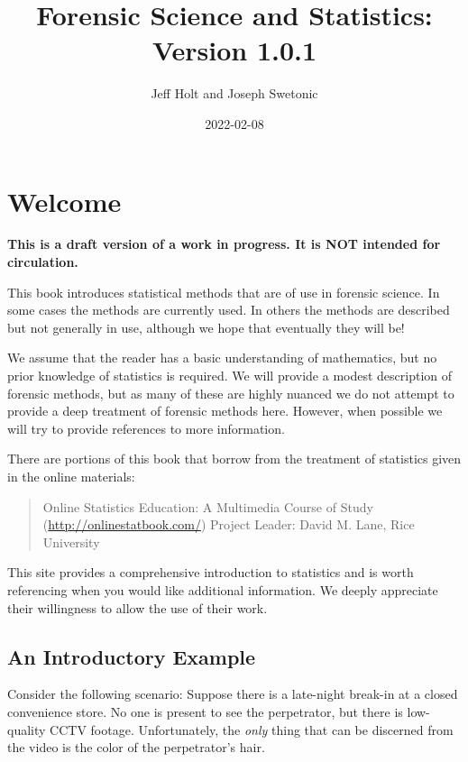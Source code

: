 \documentclass[
]{book}
\title{Forensic Science and Statistics: Version 1.0.1}
\author{Jeff Holt and Joseph Swetonic}
\date{2022-02-08}
\begin{document}
\maketitle

{
\setcounter{tocdepth}{1}
\tableofcontents
}
\hypertarget{welcome}{%
\chapter{Welcome}\label{welcome}}

\textbf{This is a draft version of a work in progress. It is NOT intended for circulation.}

This book introduces statistical methods that are of use in forensic science.
In some cases the methods are currently used.
In others the methods are described but not generally in use,
although we hope that eventually they will be!

We assume that the reader has a basic understanding of mathematics, but no prior
knowledge of statistics is required.
We will provide a modest description of forensic methods, but as many of these are
highly nuanced we do not attempt to
provide a deep treatment of forensic methods here. However, when possible we will
try to provide references to more information.

There are portions of this book that borrow from the treatment of statistics
given in the online materials:

\begin{quote}
Online Statistics Education: A Multimedia Course of Study (\url{http://onlinestatbook.com/})
Project Leader: David M. Lane, Rice University
\end{quote}

This site provides a comprehensive introduction to statistics and is worth referencing when you would like additional information.
We deeply appreciate their willingness to allow the use of their work.

\hypertarget{an-introductory-example}{%
\section{An Introductory Example}\label{an-introductory-example}}

Consider the following scenario:
Suppose there is a late-night break-in at a closed convenience store.
No one is present to see the perpetrator, but there is low-quality CCTV footage.
Unfortunately, the \emph{only} thing that can be discerned from the video is the
color of the perpetrator's hair.
\end{document}
